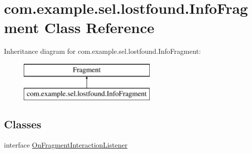 \hypertarget{classcom_1_1example_1_1sel_1_1lostfound_1_1InfoFragment}{}\section{com.\+example.\+sel.\+lostfound.\+Info\+Fragment Class Reference}
\label{classcom_1_1example_1_1sel_1_1lostfound_1_1InfoFragment}
Inheritance diagram for com.\+example.\+sel.\+lostfound.\+Info\+Fragment\+:\begin{figure}[H]
\begin{center}
\leavevmode
\includegraphics[height=2.000000cm]{classcom_1_1example_1_1sel_1_1lostfound_1_1InfoFragment}
\end{center}
\end{figure}
\subsection*{Classes}
\begin{DoxyCompactItemize}
\item 
interface \hyperlink{interfacecom_1_1example_1_1sel_1_1lostfound_1_1InfoFragment_1_1OnFragmentInteractionListener}{On\+Fragment\+Interaction\+Listener}
\end{DoxyCompactItemize}
